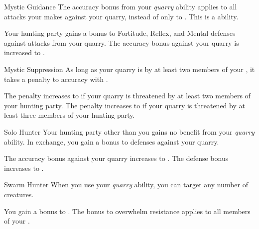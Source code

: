 {            \begin{ability}{Mystic Guidance}
                The accuracy bonus from your \textit{quarry} ability applies to all attacks your  makes against your quarry, instead of only to .
                This is a  ability.

                \rankline
                 Your hunting party gains a  bonus to Fortitude, Reflex, and Mental defenses against attacks from your quarry.
                 The accuracy bonus against your quarry is increased to .
            \end{ability}

            \begin{ability}{Mystic Suppression}
                As long as your quarry is  by at least two members of your , it takes a  penalty to accuracy with .

                \rankline
                 The penalty increases to  if your quarry is threatened by at least two members of your hunting party.
                 The penalty increases to  if your quarry is threatened by at least three members of your hunting party.
            \end{ability}

            \begin{ability}{Solo Hunter}
                Your hunting party other than you gains no benefit from your \textit{quarry} ability.
                In exchange, you gain a  bonus to defenses against your quarry.

                \rankline
                 The accuracy bonus against your quarry increases to .
                 The defense bonus increases to .
            \end{ability}

            \begin{ability}{Swarm Hunter}
                When you use your \textit{quarry} ability, you can target any number of creatures.

                \rankline
                 You gain a  bonus to .
                 The bonus to overwhelm resistance applies to all members of your .
            \end{ability}

}
